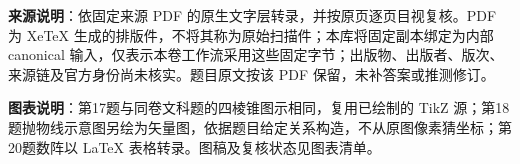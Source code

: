 


\begin{gktip}
\textbf{来源说明}：依固定来源 PDF 的原生文字层转录，并按原页逐页目视复核。PDF 为 XeTeX 生成的排版件，不将其称为原始扫描件；本库将固定副本绑定为内部 canonical 输入，仅表示本卷工作流采用这些固定字节；出版物、出版者、版次、来源链及官方身份尚未核实。题目原文按该 PDF 保留，未补答案或推测修订。

\textbf{图表说明}：第17题与同卷文科题的四棱锥图示相同，复用已绘制的 TikZ 源；第18题抛物线示意图另绘为矢量图，依据题目给定关系构造，不从原图像素猜坐标；第20题数阵以 LaTeX 表格转录。图稿及复核状态见图表清单。
\end{gktip}


